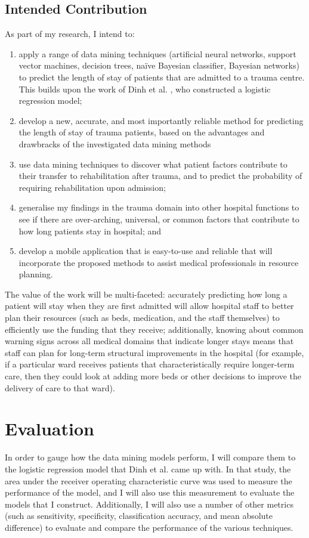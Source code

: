 \documentclass[a4paper]{article}
\begin{document}
\subsection{Intended Contribution}
As part of my research, I intend to:
\begin{enumerate}
\item apply a range of data mining techniques (artificial neural
networks, support vector machines, decision trees, na\"{i}ve Bayesian
classifier, Bayesian networks) to predict the length of stay of patients that
are admitted to a trauma centre. This builds upon the work of Dinh et al.
\citep{Dinh2013a}, who constructed a logistic regression model;
\item develop a new, accurate, and most importantly reliable method for
predicting the length of stay of trauma patients, based on the advantages and
drawbracks of the investigated data mining methods
\item use data mining techniques to discover what patient factors contribute
to their transfer to rehabilitation after trauma, and to predict the
probability of requiring rehabilitation upon admission;
\item generalise my findings in the trauma domain into other hospital functions
to see if there are over-arching, universal, or common factors that contribute
to how long patients stay in hospital; and
\item develop a mobile application that is easy-to-use and reliable that will
incorporate the proposed methods to assist medical professionals in resource
planning.
\end{enumerate}

The value of the work will be multi-faceted: accurately predicting how long
a patient will stay when they are first admitted will allow hospital staff to
better plan their resources (such as beds, medication, and the staff
themselves) to efficiently use the funding that they receive; additionally,
knowing about common warning signs across all medical domains that indicate
longer stays means that staff can plan for long-term structural improvements
in the hospital (for example, if a particular ward receives patients that
characteristically require longer-term care, then they could look at adding
more beds or other decisions to improve the delivery of care to that ward).

\section{Evaluation}
In order to gauge how the data mining models perform, I will compare them to
the logistic regression model that Dinh et al.\citep{Dinh2013a} came up with.
In that study, the area under the receiver operating characteristic curve was
used to measure the performance of the model, and I will also use this
measurement to evaluate the models that I construct. Additionally, I will
also use a number of other metrics (such as sensitivity, specificity,
classification accuracy, and mean absolute difference\citep{Walczak2003}) to
evaluate and compare the performance of the various techniques.
\end{document}
